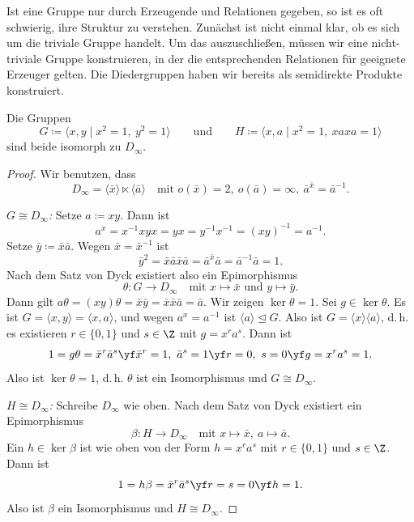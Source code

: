 \documentclass[11pt]{article}
\begin{document}
Ist eine Gruppe nur durch Erzeugende und Relationen gegeben, so ist es oft schwierig, ihre Struktur zu verstehen. Zunächst ist nicht einmal klar, ob es sich um die triviale Gruppe handelt. Um das auszuschließen, müssen wir eine nicht-triviale Gruppe konstruieren, in der die entsprechenden Relationen für geeignete Erzeuger gelten. Die Diedergruppen haben wir bereits als semidirekte Produkte konstruiert.


\begin{proposition}\Theorem
  Die Gruppen
  \[ G \coloneqq \langle x, y \mid x^2 = 1,\ y^2 = 1 \rangle \qquad \text{und} \qquad H \coloneqq \langle x, a \mid x^2 = 1,\ xaxa = 1 \rangle \]
  sind beide isomorph zu $D_\infty$.
\end{proposition}

\begin{proof}
  Wir benutzen, dass
  \[ D_\infty = \langle \bar{x} \rangle \ltimes \langle \bar{a} \rangle \quad \text{mit } o(\bar{x}) = 2,\ o(\bar{a}) = \infty,\ \bar{a}^{\bar{x}} = \bar{a}^{-1}. \]


  \textit{$G \cong D_\infty$:} Setze $a \coloneqq xy$. Dann ist
  \[ a^x = x^{-1}xyx = yx = y^{-1}x^{-1} = (xy)^{-1} = a^{-1}. \]
  Setze $\bar{y} \coloneqq \bar{x}\bar{a}$. Wegen $\bar{x} = \bar{x}^{-1}$ ist
  \[ \bar{y}^2 = \bar{x}\bar{a}\bar{x}\bar{a} = \bar{a}^{\bar{x}}\bar{a} = \bar{a}^{-1}\bar{a} = 1. \]
  Nach dem Satz von Dyck existiert also ein Epimorphismus
  \[ \theta\colon G \to D_\infty \quad \text{mit } x \mapsto \bar{x} \text{ und } y \mapsto \bar{y}. \]
  Dann gilt $a\theta = (xy)\theta = \bar{x}\bar{y} = \bar{x}\bar{x}\bar{a} = \bar{a}$. Wir zeigen $\ker\theta = 1$. Sei $g \in \ker\theta$. Es ist $G = \langle x, y \rangle = \langle x, a \rangle$, und wegen $a^x = a^{-1}$ ist $\langle a \rangle \trianglelefteq G$. Also ist $G = \langle x \rangle \langle a \rangle$, d.\,h. es existieren $r \in \{0, 1\}$ und $s \in \Z$ mit $g = x^r a^s$. Dann ist
  \[ 1 = g\theta = \bar{x}^r \bar{a}^s \yf \bar{x}^r = 1,\ \bar{a}^s = 1 \yf r = 0,\ s = 0 \yf g = x^r a^s = 1. \]
  Also ist $\ker\theta = 1$, d.\,h. $\theta$ ist ein Isomorphismus und $G \cong D_\infty$.

  \textit{$H \cong D_\infty$:} Schreibe $D_\infty$ wie oben. Nach dem Satz von Dyck existiert ein Epimorphismus
  \[ \beta\colon H \to D_\infty \quad \text{mit } x \mapsto \bar{x},\ a \mapsto \bar{a}. \]
  Ein $h \in \ker\beta$ ist wie oben von der Form $h = x^r a^s$ mit $r \in \{0, 1\}$ und $s \in \Z$. Dann ist
  \[ 1 = h\beta = \bar{x}^r \bar{a}^s \yf r = s = 0 \yf h = 1. \]
  Also ist $\beta$ ein Isomorphismus und $H \cong D_\infty$.
\end{proof}
\end{document}
